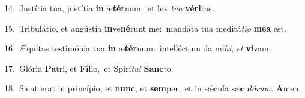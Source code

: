{\numbfont\textcolor{\numbcolor}{14.}}~Justítia tua, justítia \textbf{in} æ\-\textbf{tér}\-num:~\star et lex \textit{tu}\-\textit{a} \textbf{vé}\-\textbf{ri}tas.\par
{\numbfont\textcolor{\numbcolor}{15.}}~Tribulátio, et angústia \textbf{in}\-ve\-\textbf{né}\-runt me:~\star mandáta tua meditá\-\textit{ti}\-\textit{o} \textbf{me}\-\textbf{a} est.\par
{\numbfont\textcolor{\numbcolor}{16.}}~Æquitas testimónia tua \textbf{in} æ\-\textbf{tér}\-num:~\star intelléctum da mi\-\textit{hi}\-, \textit{et} \textbf{vi}\-vam.\par
{\numbfont\textcolor{\numbcolor}{17.}}~Glória \textbf{Pa}\-tri, et \textbf{Fí}\-lio,~\star et Spirí\-\textit{tu}\-\textit{i} \textbf{Sanc}\-to.\par
{\numbfont\textcolor{\numbcolor}{18.}}~Sicut erat in princípio, et \textbf{nunc}\-, et \textbf{sem}\-per,~\star et in sǽcula sæcu\-\textit{ló}\-\textit{rum}. \textbf{A}\-men.\par
